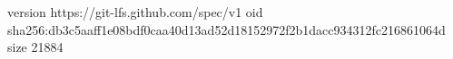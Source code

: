 version https://git-lfs.github.com/spec/v1
oid sha256:db3c5aaff1e08bdf0caa40d13ad52d18152972f2b1dacc934312fc216861064d
size 21884
